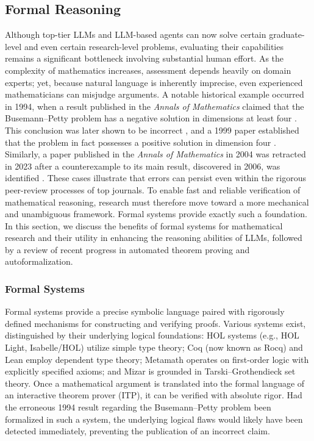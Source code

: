 \documentclass[11pt]{article}
\numberwithin{equation}{section}
\begin{document}
\subsection{Formal Reasoning}\label{subsec:fr}

Although top-tier LLMs and LLM-based agents can now solve certain graduate-level and even certain research-level problems, evaluating their capabilities remains a significant bottleneck involving substantial human effort. As the complexity of mathematics increases, assessment depends heavily on domain experts; yet, because natural language is inherently imprecise, even experienced mathematicians can misjudge arguments. A notable historical example occurred in 1994, when a result published in the \textit{Annals of Mathematics} claimed that the Busemann–Petty problem has a negative solution in dimensions at least four \cite{zhang1994intersection}. This conclusion was later shown to be incorrect \cite{koldobsky1998intersection,koldobsky1998advances}, and a 1999 paper established that the problem in fact possesses a positive solution in dimension four \cite{zhang1999positive}. Similarly, a paper \cite{schumacher2004quasi} published in the \textit{Annals of Mathematics} in 2004 was retracted in 2023 \cite{schumacher2023retraction} after a counterexample to its main result, discovered in 2006, was identified \cite{kollar2006non}. These cases illustrate that errors can persist even within the rigorous peer-review processes of top journals. To enable fast and reliable verification of mathematical reasoning, research must therefore move toward a more mechanical and unambiguous framework. Formal systems provide exactly such a foundation. In this section, we discuss the benefits of formal systems for mathematical research and their utility in enhancing the reasoning abilities of LLMs, followed by a review of recent progress in automated theorem proving and autoformalization.



 
\subsubsection{Formal Systems}

Formal systems provide a precise symbolic language paired with rigorously defined mechanisms for constructing and verifying proofs. Various systems exist, distinguished by their underlying logical foundations: HOL systems (e.g., HOL Light, Isabelle/HOL) utilize simple type theory; Coq (now known as Rocq) and Lean employ dependent type theory; Metamath operates on first-order logic with explicitly specified axioms; and Mizar is grounded in Tarski–Grothendieck set theory. Once a mathematical argument is translated into the formal language of an interactive theorem prover (ITP), it can be verified with absolute rigor. Had the erroneous 1994 result regarding the Busemann--Petty problem been formalized in such a system, the underlying logical flaws would likely have been detected immediately, preventing the publication of an incorrect claim.
\end{document}
